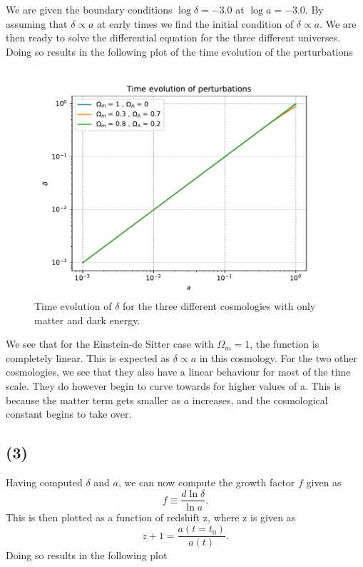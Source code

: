 \documentclass[a4paper]{article}
\begin{document}
We are given the boundary conditions $\log \delta = -3.0$ at $\log a = -3.0$. By assuming that $\delta \propto a$ at early times we find the initial condition of $\dot{\delta} \propto \dot{a}$. We are then ready to solve the differential equation for the three different universes. Doing so results in the following plot of the time evolution of the perturbations
\begin{figure}[h]
  \centering
  \includegraphics[width=0.9\linewidth]{2b.pdf}
  \caption{Time evolution of $\delta$ for the three different cosmologies with only matter and dark energy.}
  \label{fig:1}
\end{figure}

We see that for the Einstein-de Sitter case with $\Omega_m = 1$, the function is completely linear. This is expected as $\delta \propto a$ in this cosmology. For the two other cosmologies, we see that they also have a linear behaviour for most of the time scale. They do however begin to curve towards for higher values of a. This is because the matter term gets smaller as $a$ increases, and the cosmological constant begins to take over. 

\subsection*{(3)}
Having computed $\delta$ and $a$, we can now compute the growth factor $f$ given as 
\begin{equation}
    f \equiv \frac{d \ln \delta}{\ln a}.
\end{equation}
This is then plotted as a function of redshift z, where z is given as
\begin{equation}
    z +1 = \frac{a(t=t_0)}{a(t)}.
\end{equation}
Doing so results in the following plot 
\end{document}
